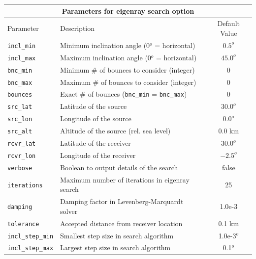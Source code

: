 \documentclass[10pt]{article}
\begin{document}
 \begin{tabular}{ | l | l | c | }
   \hline
   \multicolumn{3}{|c|}{\textbf{Parameters for eigenray search option}} \\
   \hline
   Parameter & Description & Default Value \\
   \hline \hline
  \verb=incl_min= 		& Minimum inclination angle (0\(^o\) = horizontal)			& \(0.5^o\)	\\
  \verb=incl_max= 		& Maximum inclination angle (0\(^o\) = horizontal)			& \(45.0^o\) \\ \hline
 \verb=bnc_min=		& Minimum \# of bounces to consider (integer)				& 0 \\ 
 \verb=bnc_max=		& Maximum \# of bounces to consider (integer) 				& 0 \\ 
 \verb=bounces=		& Exact \# of bounces (\verb=bnc_min= = \verb=bnc_max=)	& 0 \\ \hline
 \verb=src_lat= 			& Latitude of the source 								& \(30.0^o\) \\
 \verb=src_lon= 		& Longitude of the source								& \(0.0^o\) \\
 \verb=src_alt=  		& Altitude of the source (rel. sea level)					& \(0.0\) km \\ \hline
  \verb=rcvr_lat= 		& Latitude of the receiver								& \(30.0^o\)	\\
  \verb=rcvr_lon= 		& Longitude of the receiver							& \(-2.5^o\) \\ \hline
 \verb=verbose=		& Boolean to output details of the search					& false \\
 \verb=iterations=		& Maximum number of iterations in eigenray search			& 25 \\ 
 \verb=damping=		& Damping factor in Levenberg-Marquardt solver			& 1.0e-3 \\
 \verb=tolerance=		& Accepted distance from receiver location				& 0.1 km \\
 \verb=incl_step_min=	& Smallest step size in search algorithm					& 1.0e-3\(^o\)\\
 \verb=incl_step_max=	& Largest step size in search algorithm					& 0.1\(^o\) \\ \hline
\end{tabular}

 \vspace{0.01\textheight}
\end{document}
